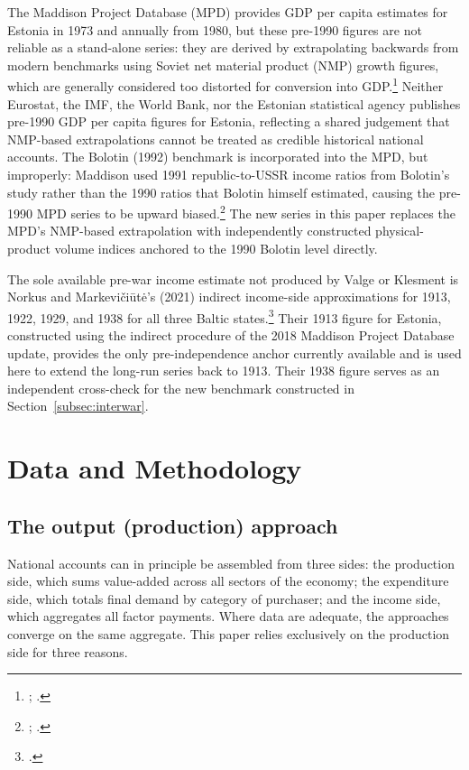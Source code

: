 \documentclass[12pt,a4paper]{article}
\begin{document}
The Maddison Project Database (MPD) provides GDP per capita estimates for Estonia in 1973 and annually from 1980, but these pre-1990 figures are not reliable as a stand-alone series: they are derived by extrapolating backwards from modern benchmarks using Soviet net material product (NMP) growth figures, which are generally considered too distorted for conversion into GDP.\footnote{\autocite[307--308]{Maddison1998b}; \autocite[279--280]{vonyoinmorys2021}.} Neither Eurostat, the IMF, the World Bank, nor the Estonian statistical agency publishes pre-1990 GDP per capita figures for Estonia, reflecting a shared judgement that NMP-based extrapolations cannot be treated as credible historical national accounts. The Bolotin (1992) benchmark is incorporated into the MPD, but improperly: Maddison used 1991 republic-to-USSR income ratios from Bolotin's study rather than the 1990 ratios that Bolotin himself estimated, causing the pre-1990 MPD series to be upward biased.\footnote{\autocite{bolotin1992}; \autocite{maddison2010}.} The new series in this paper replaces the MPD's NMP-based extrapolation with independently constructed physical-product volume indices anchored to the 1990 Bolotin level directly.

The sole available pre-war income estimate not produced by Valge or Klesment is Norkus and Markevičiūtė's (2021) indirect income-side approximations for 1913, 1922, 1929, and 1938 for all three Baltic states.\footnote{\autocite{norkusmark2021}.} Their 1913 figure for Estonia, constructed using the indirect procedure of the 2018 Maddison Project Database update, provides the only pre-independence anchor currently available and is used here to extend the long-run series back to 1913. Their 1938 figure serves as an independent cross-check for the new benchmark constructed in Section~\ref{subsec:interwar}.

\section{Data and Methodology}
\label{sec:methodology}

\subsection{The output (production) approach}
\label{subsec:output-approach}

National accounts can in principle be assembled from three sides: the production side, which sums value-added across all sectors of the economy; the expenditure side, which totals final demand by category of purchaser; and the income side, which aggregates all factor payments. Where data are adequate, the approaches converge on the same aggregate. This paper relies exclusively on the production side for three reasons.
\end{document}
